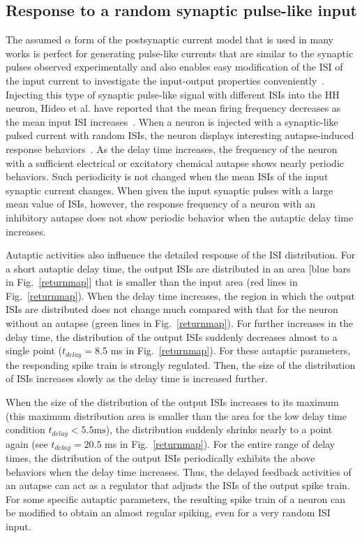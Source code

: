 \documentclass[twocolumn,showpacs,preprintnumbers,amsmath,amssymb,pre,superscriptaddress]{revtex4-1}
\begin{document}
\begin{CJK}{UTF8}{gbsn}
\subsection{Response to a random synaptic pulse-like input}

The assumed $\alpha$ form of the postsynaptic current model that is used in many works is perfect for generating pulse-like currents that are similar to the synaptic pulses observed experimentally and also enables easy modification of the ISI of the input current to investigate the input-output properties conveniently~\cite{wanght}. Injecting this type of synaptic pulse-like signal with different ISIs into the HH neuron, Hideo et al. have reported that the mean firing frequency decreases as the mean input ISI increases~\cite{Hideo,Borkowski}. When a neuron is injected with a synaptic-like pulsed current with random ISIs, the neuron displays interesting autapse-induced response behaviors~\cite{wht_chaos}. As the delay time increases, the frequency of the neuron with a sufficient electrical or excitatory chemical autapse shows nearly periodic behaviors. Such periodicity is not changed when the mean ISIs of the input synaptic current changes. When given the input synaptic pulses with a large mean value of ISIs, however, the response frequency of a neuron with an inhibitory autapse does not show periodic behavior when the autaptic delay time increases. 

Autaptic activities also influence the detailed response of the ISI distribution. For a short autaptic delay time, the output ISIs are distributed in an area [blue bars in Fig.~\ref{returnmap}] that is smaller than the input area (red lines in Fig.~\ref{returnmap}). When the delay time increases, the region in which the output ISIs are distributed does not change much compared with that for the neuron without an autapse (green lines in Fig.~\ref{returnmap}). For further increases in the delay time, the distribution of the output ISIs suddenly decreases almost to a single point ($t_{delay}=8.5$ ms in Fig.~\ref{returnmap}). For these autaptic parameters, the responding spike train is strongly regulated.
Then, the size of the distribution of ISIs increases slowly as the delay time is increased further.

When the size of the distribution of the output ISIs increases to its maximum (this maximum distribution area is smaller than the area for the low delay time condition $t_{delay}<5.5 \mathrm{ms}$), the distribution suddenly shrinks nearly to a point again (see $t_{delay}=20.5$ ms in Fig.~\ref{returnmap}). For the entire range of delay times, the distribution of the output ISIs periodically exhibits the above behaviors when the delay time increases. Thus, the delayed feedback activities of an autapse can act as a regulator that adjusts the ISIs of the output spike train. For some specific autaptic parameters, the resulting spike train of a neuron can be modified to obtain an almost regular spiking, even for a very random ISI input.


\end{CJK}
\end{document}

